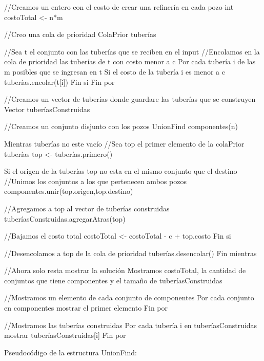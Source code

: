 \begin{codesnippet}
//Creamos un entero con el costo de crear una refinería en cada pozo
int costoTotal <- n*m

//Creo una cola de prioridad
ColaPrior tuberías

//Sea t el conjunto con las tuberías que se reciben en el input
//Encolamos en la cola de prioridad las tuberías de t con costo menor a c
Por cada tubería i de las m posibles que se ingresan en t
	Si el costo de la tubería i es menor a c
    	tuberías.encolar(t[i])
    Fin si
Fin por

//Creamos un vector de tuberías donde guardare las tuberías que se construyen
Vector tuberíasConstruidas

//Creamos un conjunto disjunto con los pozos
UnionFind componentes(n)

Mientras tuberías no este vacío
  //Sea top el primer elemento de la colaPrior tuberías
  	top <- tuberías.primero()

    Si el origen de la tuberías top no esta en el mismo conjunto que el destino
      //Unimos los conjuntos a los que pertenecen ambos pozos
        componentes.unir(top.origen,top.destino)

        //Agregamos a top al vector de tuberías construidas
        tuberíasConstruidas.agregarAtras(top)

        //Bajamos el costo total
        costoTotal <- costoTotal - c + top.costo
    Fin si

    //Desencolamos a top de la cola de prioridad
    tuberías.desencolar()
Fin mientras

//Ahora solo resta mostrar la solución
Mostramos costoTotal, la cantidad de conjuntos que tiene componentes y
el tamaño de tuberíasConstruidas

//Mostramos un elemento de cada conjunto de componentes
Por cada conjunto en componentes
	mostrar el primer elemento
Fin por

//Mostramos las tuberías construidas
Por cada tubería i en tuberíasConstruidas
	mostrar tuberíasConstruidas[i]
Fin por
\end{codesnippet}
Pseudocódigo de la estructura UnionFind: \\

